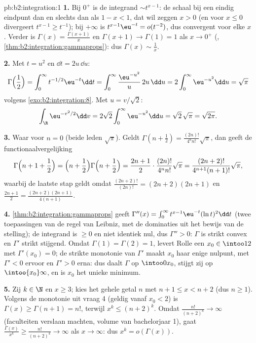 \begin{solution}{pb:b2:integration:1}
\textbf{1.} Bij $0^+$ is de integrand $\sim t^{x-1}$: de schaal bij
een eindig eindpunt  dan en slechts dan als $1 - x < 1$,
dat wil zeggen $x > 0$ (en voor $x \leq 0$ divergeert $t^{x-1} \geq
t^{-1}$); bij $+\infty$ is $t^{x-1}\eu^{-t} = o(t^{-2})$, dus
convergent voor elke $x$. Verder is $\Gamma(x) =
\frac{\Gamma(x+1)}{x}$ en $\Gamma(x+1) \to \Gamma(1) = 1$ als $x
\to 0^+$ (, \cref{thm:b2:integration:gammaprops}): dus
$\Gamma(x) \sim \frac1x$.

\textbf{2.} Met $t = u^2$ en $\dd t = 2u\,\dd u$:
\[
\Gamma\Bigl(\frac12\Bigr) = \int_0^\infty
t^{-1/2}\eu^{-t}\dd t
= \int_0^\infty \frac{\eu^{-u^2}}{u}\,2u\,\dd u
= 2\int_0^\infty \eu^{-u^2}\dd u = \sqrt\pi
\]
volgens \cref{exo:b2:integration:8}. Met $u = v/\sqrt2$:
\[
\int_\R \eu^{-v^2/2}\dd v
= 2\sqrt2\int_0^\infty \eu^{-u^2}\dd u
= \sqrt2\,\sqrt\pi = \sqrt{2\pi} .
\]

\textbf{3.} Waar voor $n = 0$ (beide leden $\sqrt\pi$). Geldt
$\Gamma(n + \frac12) = \frac{(2n)!}{4^n n!}\sqrt\pi$, dan geeft de
functionaalvergelijking
\[
\Gamma\Bigl(n + 1 + \frac12\Bigr)
= \Bigl(n + \frac12\Bigr)\Gamma\Bigl(n + \frac12\Bigr)
= \frac{2n+1}{2}\cdot\frac{(2n)!}{4^n n!}\sqrt\pi
= \frac{(2n+2)!}{4^{n+1}(n+1)!}\sqrt\pi ,
\]
waarbij de laatste stap geldt omdat $\frac{(2n+2)!}{(2n)!} =
(2n+2)(2n+1)$ en $\frac{2n+1}{2} = \frac{(2n+2)(2n+1)}{4(n+1)}$.

\textbf{4.} \cref{thm:b2:integration:gammaprops} geeft $\Gamma''(x)
= \int_0^\infty t^{x-1}\eu^{-t}(\ln t)^2\dd t$ (twee toepassingen
van de regel van Leibniz, met de dominaties uit het bewijs van de
stelling); de integrand is $\geq 0$ en niet identiek nul, dus
$\Gamma'' > 0$: $\Gamma$ is strikt convex en $\Gamma'$ strikt
stijgend. Omdat $\Gamma(1) = \Gamma(2) = 1$, levert Rolle een $x_0
\in \intoo12$ met $\Gamma'(x_0) = 0$; de strikte monotonie van
$\Gamma'$ maakt $x_0$ haar enige nulpunt, met $\Gamma' < 0$ ervoor
en $\Gamma' > 0$ erna: dus daalt $\Gamma$ op $\intoo0{x_0}$, stijgt
zij op $\intoo{x_0}\infty$, en is $x_0$ het unieke minimum.

\textbf{5.} Zij $k \in \N$ en $x \geq 3$; kies het gehele getal $n$
met $n + 1 \leq x < n + 2$ (dus $n \geq 1$). Volgens de monotonie
uit vraag 4 (geldig vanaf $x_0 < 2$) is $\Gamma(x) \geq \Gamma(n +
1) = n!$, terwijl $x^k \leq (n+2)^k$. Omdat $\frac{n!}{(n+2)^k} \to
\infty$ (faculteiten verslaan machten, volume van bachelorjaar 1),
gaat $\frac{\Gamma(x)}{x^k} \geq \frac{n!}{(n+2)^k} \to \infty$ als
$x \to \infty$: dus $x^k = o(\Gamma(x))$.


\end{solution}
